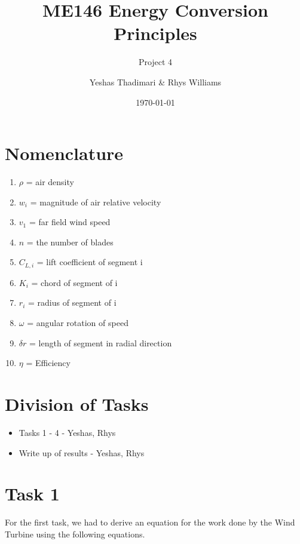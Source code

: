 \documentclass[11pt,a4paper]{article}
\title{ME146 Energy Conversion Principles}
\subtitle{Project 4}
\author{Yeshas Thadimari \& Rhys Williams}
\date{\today}
\begin{document}
\maketitle
\newpage
\section*{Nomenclature}
\begin{enumerate}
\item $\rho$ = air density
\item $w_i$ = magnitude of air relative velocity
\item $v_1$ = far field wind speed
\item $n$ = the number of blades
\item $C_{L,i}$ = lift coefficient of segment i
\item $K_i$ = chord of segment of i 
\item $r_i$ = radius of segment of i 
\item $\omega$ = angular rotation of speed
\item $\delta r$ = length of segment in radial direction 
\item $\eta$ = Efficiency 
\end{enumerate}
\section*{Division of Tasks}
\begin{itemize}
\item Tasks 1 - 4 - Yeshas, Rhys
\item Write up of results - Yeshas, Rhys
\end{itemize}
\section*{Task 1}
For the first task, we had to derive an equation for the work done by the Wind Turbine using the following equations.
\end{document}
